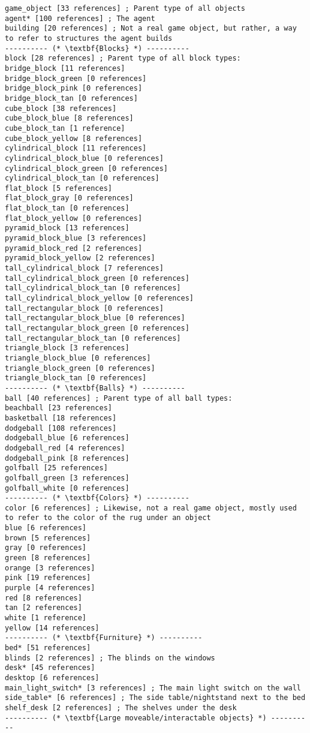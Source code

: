 \documentclass{article}
\begin{document}
\begin{lstlisting}
game_object [33 references] ; Parent type of all objects
agent* [100 references] ; The agent
building [20 references] ; Not a real game object, but rather, a way to refer to structures the agent builds
---------- (* \textbf{Blocks} *) ----------
block [28 references] ; Parent type of all block types:
bridge_block [11 references]
bridge_block_green [0 references]
bridge_block_pink [0 references]
bridge_block_tan [0 references]
cube_block [38 references]
cube_block_blue [8 references]
cube_block_tan [1 reference]
cube_block_yellow [8 references]
cylindrical_block [11 references]
cylindrical_block_blue [0 references]
cylindrical_block_green [0 references]
cylindrical_block_tan [0 references]
flat_block [5 references]
flat_block_gray [0 references]
flat_block_tan [0 references]
flat_block_yellow [0 references]
pyramid_block [13 references]
pyramid_block_blue [3 references]
pyramid_block_red [2 references]
pyramid_block_yellow [2 references]
tall_cylindrical_block [7 references]
tall_cylindrical_block_green [0 references]
tall_cylindrical_block_tan [0 references]
tall_cylindrical_block_yellow [0 references]
tall_rectangular_block [0 references]
tall_rectangular_block_blue [0 references]
tall_rectangular_block_green [0 references]
tall_rectangular_block_tan [0 references]
triangle_block [3 references]
triangle_block_blue [0 references]
triangle_block_green [0 references]
triangle_block_tan [0 references]
---------- (* \textbf{Balls} *) ----------
ball [40 references] ; Parent type of all ball types:
beachball [23 references]
basketball [18 references]
dodgeball [108 references]
dodgeball_blue [6 references]
dodgeball_red [4 references]
dodgeball_pink [8 references]
golfball [25 references]
golfball_green [3 references]
golfball_white [0 references]
---------- (* \textbf{Colors} *) ----------
color [6 references] ; Likewise, not a real game object, mostly used to refer to the color of the rug under an object
blue [6 references]
brown [5 references]
gray [0 references]
green [8 references]
orange [3 references]
pink [19 references]
purple [4 references]
red [8 references]
tan [2 references]
white [1 reference]
yellow [14 references]
---------- (* \textbf{Furniture} *) ----------
bed* [51 references]
blinds [2 references] ; The blinds on the windows
desk* [45 references]
desktop [6 references]
main_light_switch* [3 references] ; The main light switch on the wall
side_table* [6 references] ; The side table/nightstand next to the bed
shelf_desk [2 references] ; The shelves under the desk
---------- (* \textbf{Large moveable/interactable objects} *) ----------

\end{lstlisting}
\end{document}

